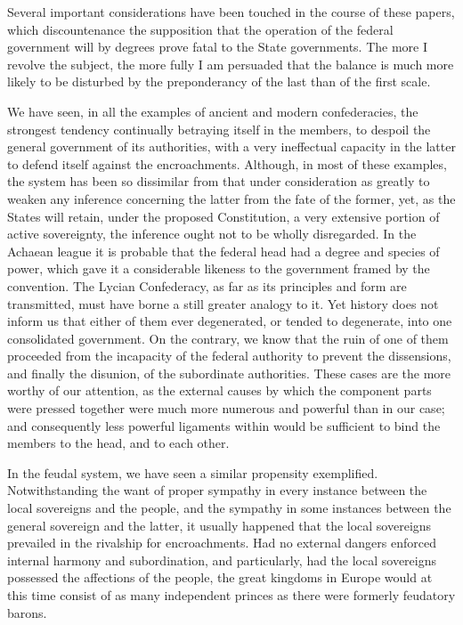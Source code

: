Several important considerations have been touched in the course of these papers, which discountenance the supposition that the operation of the federal government will by degrees prove fatal to the State governments. 
The more I revolve the subject, the more fully I am persuaded that the balance is much more likely to be disturbed by the preponderancy of the last than of the first scale.

We have seen, in all the examples of ancient and modern confederacies, the strongest tendency continually betraying itself in the members, to despoil the general government of its authorities, with a very ineffectual capacity in the latter to defend itself against the encroachments. 
Although, in most of these examples, the system has been so dissimilar from that under consideration as greatly to weaken any inference concerning the latter from the fate of the former, yet, as the States will retain, under the proposed Constitution, a very extensive portion of active sovereignty, the inference ought not to be wholly disregarded. 
In the Achaean league it is probable that the federal head had a degree and species of power, which gave it a considerable likeness to the government framed by the convention. 
The Lycian Confederacy, as far as its principles and form are transmitted, must have borne a still greater analogy to it. 
Yet history does not inform us that either of them ever degenerated, or tended to degenerate, into one consolidated government. 
On the contrary, we know that the ruin of one of them proceeded from the incapacity of the federal authority to prevent the dissensions, and finally the disunion, of the subordinate authorities. 
These cases are the more worthy of our attention, as the external causes by which the component parts were pressed together were much more numerous and powerful than in our case; and consequently less powerful ligaments within would be sufficient to bind the members to the head, and to each other.

In the feudal system, we have seen a similar propensity exemplified. 
Notwithstanding the want of proper sympathy in every instance between the local sovereigns and the people, and the sympathy in some instances between the general sovereign and the latter, it usually happened that the local sovereigns prevailed in the rivalship for encroachments. 
Had no external dangers enforced internal harmony and subordination, and particularly, had the local sovereigns possessed the affections of the people, the great kingdoms in Europe would at this time consist of as many independent princes as there were formerly feudatory barons.

